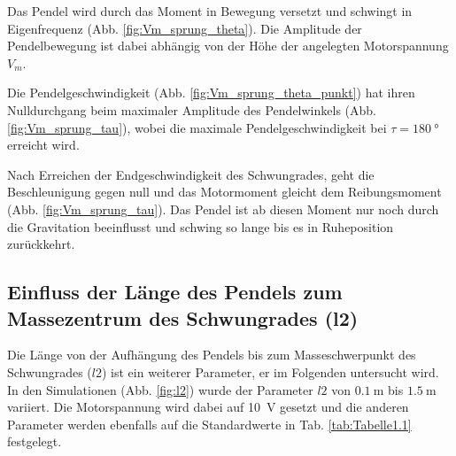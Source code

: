 Das Pendel wird durch das Moment in Bewegung versetzt und schwingt in Eigenfrequenz (Abb. \ref{fig:Vm_sprung_theta}). 
Die Amplitude der Pendelbewegung ist dabei abhängig von der Höhe der angelegten Motorspannung $V_m$.

Die Pendelgeschwindigkeit (Abb. \ref{fig:Vm_sprung_theta_punkt}) hat ihren Nulldurchgang beim maximaler Amplitude des Pendelwinkels (Abb. \ref{fig:Vm_sprung_tau}), wobei die maximale Pendelgeschwindigkeit bei $\tau=\SI{180}{\degree}$ erreicht wird.

Nach Erreichen der Endgeschwindigkeit des Schwungrades, geht die Beschleunigung gegen null und das Motormoment gleicht dem Reibungsmoment (Abb. \ref{fig:Vm_sprung_tau}).
Das Pendel ist ab diesen Moment nur noch durch die Gravitation beeinflusst und schwing so lange bis es in Ruheposition zurückkehrt.

\subsection*{Einfluss der Länge des Pendels zum Massezentrum des Schwungrades (l2)}
Die Länge von der Aufhängung des Pendels bis zum Masseschwerpunkt des Schwungrades ($l2$) ist ein weiterer Parameter, er im Folgenden untersucht wird.
In den Simulationen (Abb. \ref{fig:l2}) wurde der Parameter $l2$ von $\SI{0.1}{\m}$ bis $\SI{1.5}{\m}$ variiert.
Die Motorspannung wird dabei auf \SI{10}{\volt} gesetzt und die anderen Parameter werden ebenfalls auf die Standardwerte in Tab. \ref{tab:Tabelle1.1} festgelegt.
\pagebreak

